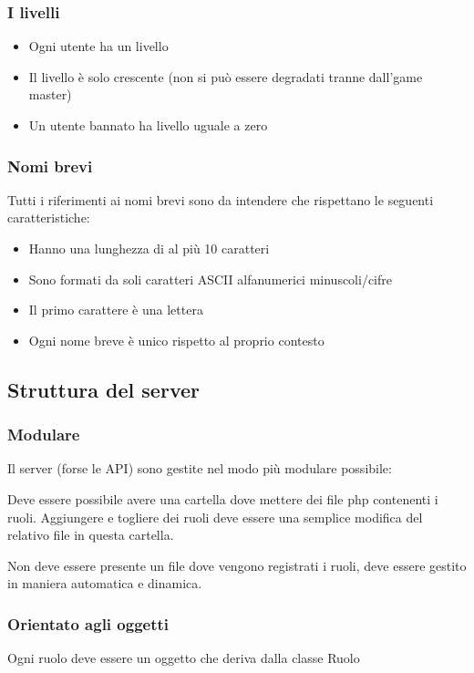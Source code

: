 \documentclass[10pt,a4paper]{article}
\begin{document}
\subsubsection{I livelli}
\begin{itemize}
\item Ogni utente ha un livello
\item Il livello è solo crescente (non si può essere degradati tranne dall'game master)
\item Un utente bannato ha livello uguale a zero
\end{itemize}

\subsubsection{Nomi brevi}
Tutti i riferimenti ai nomi brevi sono da intendere che rispettano le seguenti caratteristiche:
\begin{itemize}
\item Hanno una lunghezza di al più 10 caratteri
\item Sono formati da soli caratteri ASCII alfanumerici minuscoli/cifre
\item Il primo carattere è una lettera
\item Ogni nome breve è unico rispetto al proprio contesto
\end{itemize}

\subsection{Struttura del server}
\subsubsection*{Modulare}
Il server (forse le API) sono gestite nel modo più modulare possibile:

Deve essere possibile avere una cartella dove mettere dei file php contenenti i ruoli. Aggiungere e togliere dei ruoli deve essere una semplice modifica del relativo file in questa cartella. 

Non deve essere presente un file dove vengono registrati i ruoli, deve essere gestito in maniera automatica e dinamica.

\subsubsection*{Orientato agli oggetti}
Ogni ruolo deve essere un oggetto che deriva dalla classe \textsf{Ruolo}
\end{document}
